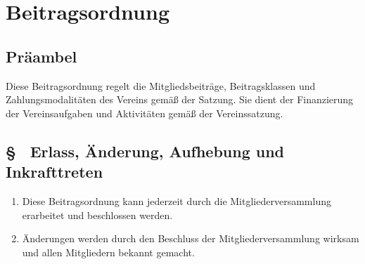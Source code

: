 \setcounter{boparagraphcounter}{1}

\section{Beitragsordnung}

\subsection{Präambel}
Diese Beitragsordnung regelt die Mitgliedsbeiträge, Beitragsklassen und Zahlungsmodalitäten des Vereins gemäß  der Satzung. Sie dient der Finanzierung der Vereinsaufgaben und Aktivitäten gemäß der Vereinssatzung.

\subsection{§ \theboparagraphcounter\ Erlass, Änderung, Aufhebung und Inkrafttreten} \label{bo:par:erlass_aenderung_aufhebung}
\begin{enumerate}
    \item \label{bo:abs:q650ly} Diese Beitragsordnung kann jederzeit durch die Mitgliederversammlung erarbeitet und beschlossen werden.

    \item \label{bo:abs:agu38l} Änderungen werden durch den Beschluss der Mitgliederversammlung wirksam und allen Mitgliedern bekannt gemacht.
\end{enumerate}

